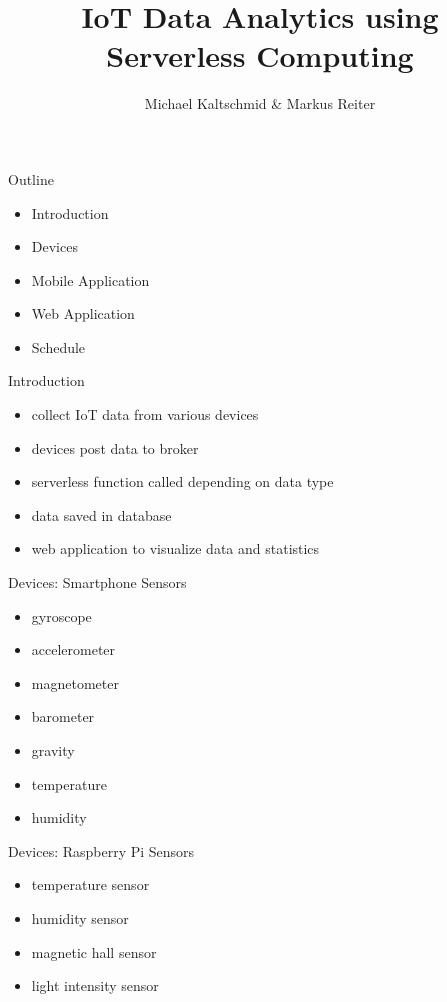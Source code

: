 \documentclass[aspectratio=1610]{beamer}
\title{IoT Data Analytics using Serverless Computing}
\author{Michael Kaltschmid \& Markus Reiter}
\date{}
\begin{document}
  \maketitle

  \begin{frame}{Outline}
    \begin{itemize}
      \item Introduction
      \item Devices
      \item Mobile Application
      \item Web Application
      \item Schedule
    \end{itemize}
  \end{frame}

  \begin{frame}{Introduction}
    \begin{itemize}
      \item collect IoT data from various devices
      \item devices post data to broker
      \item serverless function called depending on data type
      \item data saved in database
      \item web application to visualize data and statistics
    \end{itemize}
  \end{frame}

  \begin{frame}{Devices: Smartphone}
    Sensors

    \begin{itemize}
      \item gyroscope
      \item accelerometer
      \item magnetometer
      \item barometer
      \item gravity
      \item temperature
      \item humidity
    \end{itemize}
  \end{frame}

  \begin{frame}{Devices: Raspberry Pi}
    Sensors

    \begin{itemize}
      \item temperature sensor
      \item humidity sensor
      \item magnetic hall sensor
      \item light intensity sensor
    \end{itemize}
  \end{frame}
\end{document}
